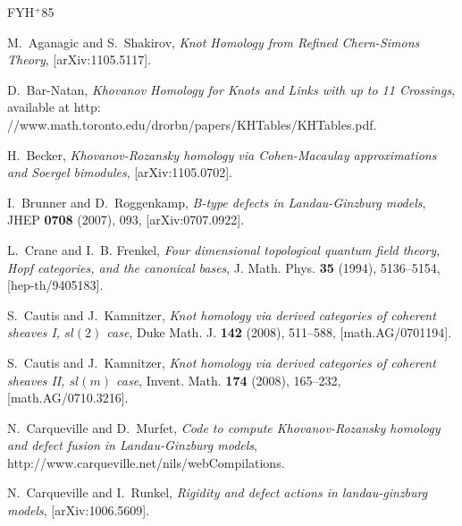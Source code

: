\documentclass{compositio}
\theoremstyle{definition}
\numberwithin{equation}{section}
\begin{document}
\newcommand{\etalchar}[1]{$^{#1}$}
\providecommand{\href}[2]{#2}
\begin{thebibliography}{FYH{\etalchar{+}}85}

M.~Aganagic and S.~Shakirov, \emph{Knot {H}omology from {R}efined
  {C}hern-{S}imons {T}heory},
  \href{http://arxiv.org/abs/1105.5117}{[arXiv:1105.5117]}.

D.~Bar-Natan, \emph{Khovanov {H}omology for {K}nots and {L}inks with up to 11
  {C}rossings}, available at
  \href{http://www.math.toronto.edu/drorbn/papers/KHTables/KHTables.pdf}{http:%
//www.math.toronto.edu/drorbn/papers/KHTables/KHTables.pdf}.

H.~Becker, \emph{Khovanov-Rozansky homology via Cohen-Macaulay approximations and Soergel bimodules},
  \href{http://arxiv.org/abs/1105.0702}{[arXiv:1105.0702]}.

I.~Brunner and D.~Roggenkamp, \emph{B-type defects in {L}andau-{G}inzburg
  models}, JHEP \textbf{0708} (2007), 093,
  \href{http://arxiv.org/abs/0707.0922}{[arXiv:0707.0922]}.

L.~Crane and I.~B. Frenkel, \emph{Four dimensional topological quantum field
  theory, {H}opf categories, and the canonical bases}, J. Math. Phys.
  \textbf{35} (1994), 5136--5154,
  \href{http://arxiv.org/abs/hep-th/9405183}{[hep-th/9405183]}.

S.~Cautis and J.~Kamnitzer, \emph{Knot homology via derived categories of
  coherent sheaves {I}, {$sl(2)$} case}, Duke Math. J. \textbf{142} (2008),
  511--588, \href{http://arxiv.org/abs/math/0701194}{[math.AG/0701194]}.

S.~Cautis and J.~Kamnitzer, \emph{Knot homology via derived categories of coherent sheaves {II},
  {$sl(m)$} case}, Invent. Math. \textbf{174} (2008), 165--232,
  \href{http://arxiv.org/abs/math/0710.3216}{[math.AG/0710.3216]}.

N.~Carqueville and D.~Murfet, \emph{Code to compute {K}hovanov-{R}ozansky
  homology and defect fusion in {L}andau-{G}inzburg models},
  \href{http://www.carqueville.net/nils/webCompilations}{http://www.carqueville.net/nils/webCompilations}.

N.~Carqueville and I.~Runkel, \emph{Rigidity and defect actions in
  landau-ginzburg models},
  \href{http://arxiv.org/abs/1006.5609}{[arXiv:1006.5609]}.


\end{thebibliography}
\end{document}
